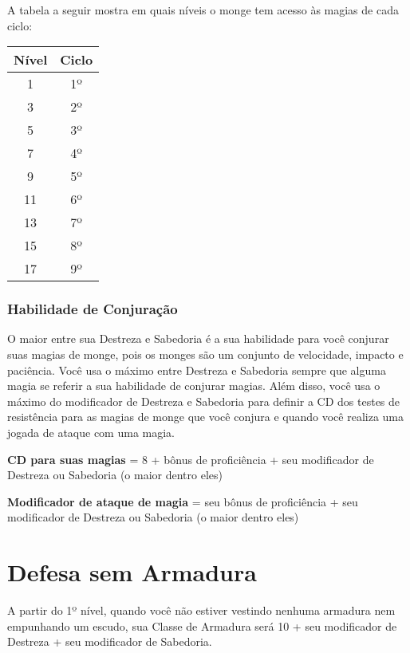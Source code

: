 \begin{multicols}{2}
A tabela a seguir mostra em quais níveis o monge tem acesso às magias de cada
ciclo:

\begin{center}
\begin{tabular}{|||c||c|||}
    \hline
    \textbf{Nível} & \textbf{Ciclo} \\
    \hline
    1 & 1º \\
    \hline
    3 & 2º \\
    \hline
    5 & 3º \\
    \hline
    7 & 4º \\
    \hline
    9 & 5º \\
    \hline
    11 & 6º \\
    \hline
    13 & 7º \\
    \hline
    15 & 8º \\
    \hline
    17 & 9º \\
    \hline
\end{tabular}
\end{center}

\subsubsection*{Habilidade de Conjuração}%

O maior entre sua Destreza e Sabedoria é a sua habilidade para você conjurar
suas magias de monge, pois os monges são um conjunto de velocidade, impacto e
paciência. Você usa o máximo entre Destreza e Sabedoria sempre que alguma magia
se referir a sua habilidade de conjurar magias. Além disso, você usa o máximo do
modificador de Destreza e Sabedoria para definir a CD dos testes de resistência
para as magias de monge que você conjura e quando você realiza uma jogada de
ataque com uma magia.

\begin{center}
\textbf{CD para suas magias} = 8 + bônus de proficiência + seu modificador de
Destreza ou Sabedoria (o maior dentro eles) \nl

\textbf{Modificador de ataque de magia} = seu bônus de proficiência + seu
modificador de Destreza ou Sabedoria (o maior dentro eles)
\end{center}

\section*{Defesa sem Armadura}%

A partir do 1º nível, quando você não estiver vestindo nenhuma armadura nem
empunhando um escudo, sua Classe de Armadura será 10 + seu modificador de
Destreza + seu modificador de Sabedoria.


\end{multicols}
